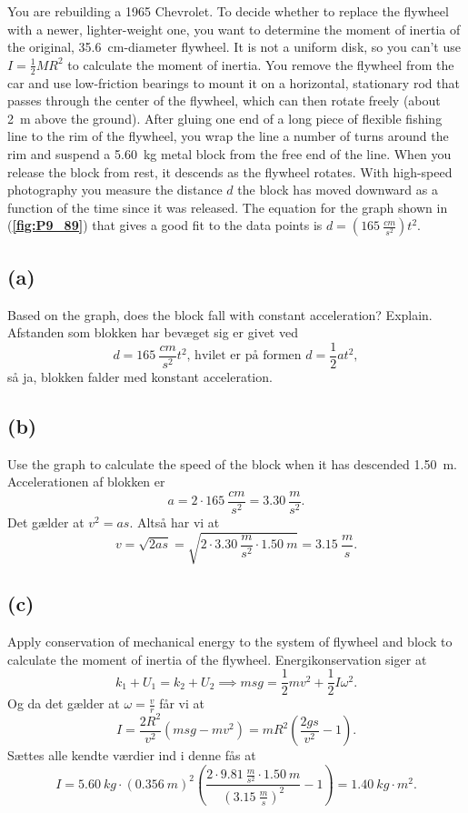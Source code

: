 \documentclass[12pt]{article}
\begin{document}
You are rebuilding a 1965 Chevrolet. To decide whether to replace the flywheel with a newer, lighter-weight one, you want to determine the moment of inertia of the original, \qty{35,6}{cm}-diameter flywheel. It is not a uniform disk, so you can’t use $I = \frac{1}{2}MR^2$ to calculate the moment of inertia. You remove the flywheel from the car and use low-friction bearings to mount it on a horizontal, stationary rod that passes through the center of the flywheel, which can then rotate freely (about \qty{2}{m} above the ground). After gluing one end of a long piece of flexible fishing line to the rim of the flywheel, you wrap the line a number of turns around the rim and suspend a \qty{5,60}{kg} metal block from the free end of the line. When you release the block from rest, it descends as the flywheel rotates. With high-speed photography you measure the distance $d$ the block has moved downward as a function of the time since it was released. The equation for the graph shown in (\textbf{\autoref{fig:P9_89}}) that gives a good fit to the data points is $d = \left( \qty{165}{\frac{cm}{s^2}} \right)t^2$. 


\subsection*{(a)}
Based on the graph, does the block fall with constant acceleration? Explain.
\bigbreak
Afstanden som blokken har bevæget sig er givet ved
\[
d =\qty{165}{\frac{cm}{s^2}t^2} \text{, hvilet er på formen } d = \frac{1}{2}at^2
,\] 
så ja, blokken falder med konstant acceleration.


\subsection*{(b)}
Use the graph to calculate the speed of the block when it has descended \qty{1,50}{m}.
\bigbreak
Accelerationen af blokken er
\[
a = 2\cdot \qty{165}{\frac{cm}{s^2}} = \qty{3,30}{\frac{m}{s^2}}
.\]
Det gælder at $v^2 = as$. Altså har vi at
\[
v = \sqrt{2as} = \sqrt{2\cdot \qty{3,30}{\frac{m}{s^2}}\cdot \qty{1,50}{m}} = \qty{3,15}{\frac{m}{s}} 
.\] 


\subsection*{(c)}
Apply conservation of mechanical energy to the system of flywheel and block to calculate the moment of inertia of the flywheel.
\bigbreak
Energikonservation siger at
\[
k_1+U_1 = k_2+U_2 \implies msg = \frac{1}{2}mv^2 + \frac{1}{2}I\omega^2
.\] 
Og da det gælder at $\omega = \frac{v}{r}$ får vi at
\[
I = \frac{2R^2}{v^2} \left(msg - mv^2\right) = mR^2\left( \frac{2gs}{v^2} -1 \right) 
.\] 
Sættes alle kendte værdier ind i denne fås at
\[
I = \qty{5,60}{kg}\cdot (\qty{0,356}{m})^2 \left( \frac{2\cdot \qty{9,81}{\frac{m}{s^2}}\cdot \qty{1,50}{m}}{\left(\qty{3,15}{\frac{m}{s}}\right)^2} -1 \right) = \qty{1,40}{kg\cdot m^2}
.\] 
 
\end{document}
